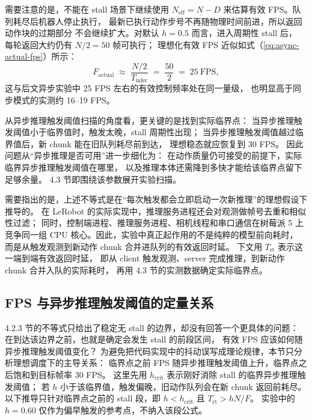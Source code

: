 需要注意的是，不能在 stall 场景下继续使用
$N_{\text{eff}}=N-D$ 来估算有效 FPS。队列耗尽后机器人停止执行，
最新已执行动作步号不再随物理时间前进，所以返回动作块的过期部分
不会继续扩大。对默认 $h=0.5$ 而言，进入周期性 stall 后，
每轮返回大约仍有 $N/2=50$ 帧可执行；
理想化有效 FPS 近似如式（\ref{eq:async-actual-fps}）所示：
\begin{equation}
  F_{\text{actual}} \;\approx\; \frac{N/2}{T_{\text{infer}}}
  \;=\; \frac{50}{2} \;=\; 25\ \text{FPS},
  \label{eq:async-actual-fps}
\end{equation}
这与后文异步实验中 25 FPS 左右的有效控制频率处在同一量级，
也明显高于同步模式的实测约 16--19 FPS。

从异步推理触发阈值扫描的角度看，更关键的是找到实际临界点：
当异步推理触发阈值小于临界值时，触发太晚，stall 周期性出现；
当异步推理触发阈值越过临界值后，新 chunk 能在旧队列耗尽前到达，
理想稳态就应恢复到 30 FPS。
因此问题从“异步推理是否可用”进一步细化为：
在动作质量仍可接受的前提下，实际临界异步推理触发阈值在哪里，
以及推理本体还需降到多快才能给该临界点留下足够余量。
4.3 节即围绕该参数展开实验扫描。

需要指出的是，上述不等式是在“每次触发都会立即启动一次新推理”的理想假设下推导的。
在 LeRobot 的实际实现中，推理服务进程还会对观测做帧号去重和相似性过滤；
同时，控制端进程、推理服务进程、相机线程和串口通信在树莓派 5
上竞争同一组 CPU 核心。因此，实验中真正起作用的不是纯粹的模型前向耗时，
而是从触发观测到新动作 chunk 合并进队列的有效返回时延。
下文用 $T_{\text{rt}}$ 表示这一端到端有效返回时延，
即从 client 触发观测、server 完成推理，到新动作 chunk 合并入队的实际耗时，
再用 4.3 节的实测数据确定实际临界点。

\subsection{FPS 与异步推理触发阈值的定量关系}\label{sec:async-inf-fps-hold}

4.2.3 节的不等式只给出了稳定无 stall 的边界，却没有回答一个更具体的问题：
在到达该边界之前，也就是确定会发生 stall 的前段区间，
有效 FPS 应该如何随异步推理触发阈值变化？
为避免把代码实现中的抖动误写成理论规律，本节只分析理想调度下的主导关系：
临界点之前 FPS 随异步推理触发阈值上升，临界点之后饱和到目标帧率 30 FPS。
这里先用 $h_{\text{crit}}$ 表示刚好消除 stall 的临界异步推理触发阈值；
若 $h$ 小于该临界值，触发偏晚，旧动作队列会在新 chunk 返回前耗尽。
以下推导只针对临界点之前的 stall 段，即
$h<h_{\text{crit}}$ 且 $T_{\text{rt}}>hN/F$。
实验中的 $h=0.60$ 仅作为偏早触发的参考点，不纳入该段公式。

